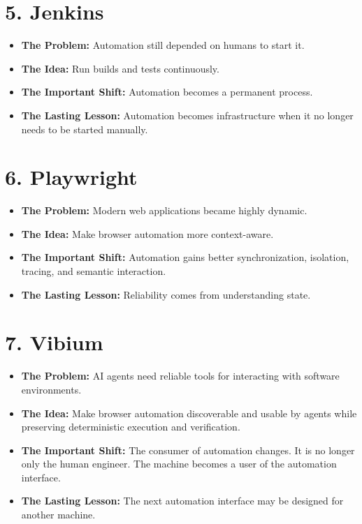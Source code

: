 \documentclass[11pt,twoside]{book}
\begin{document}
\section*{5. Jenkins}
\begin{itemize}[nosep]
    \item \textbf{The Problem:} Automation still depended on humans to start it.
    \item \textbf{The Idea:} Run builds and tests continuously.
    \item \textbf{The Important Shift:} Automation becomes a permanent process.
    \item \textbf{The Lasting Lesson:} Automation becomes infrastructure when it no longer needs to be started manually.
\end{itemize}

\section*{6. Playwright}
\begin{itemize}[nosep]
    \item \textbf{The Problem:} Modern web applications became highly dynamic.
    \item \textbf{The Idea:} Make browser automation more context-aware.
    \item \textbf{The Important Shift:} Automation gains better synchronization, isolation, tracing, and semantic interaction.
    \item \textbf{The Lasting Lesson:} Reliability comes from understanding state.
\end{itemize}

\section*{7. Vibium}
\begin{itemize}[nosep]
    \item \textbf{The Problem:} AI agents need reliable tools for interacting with software environments.
    \item \textbf{The Idea:} Make browser automation discoverable and usable by agents while preserving deterministic execution and verification.
    \item \textbf{The Important Shift:} The consumer of automation changes. It is no longer only the human engineer. The machine becomes a user of the automation interface.
    \item \textbf{The Lasting Lesson:} The next automation interface may be designed for another machine.
\end{itemize}
\end{document}
